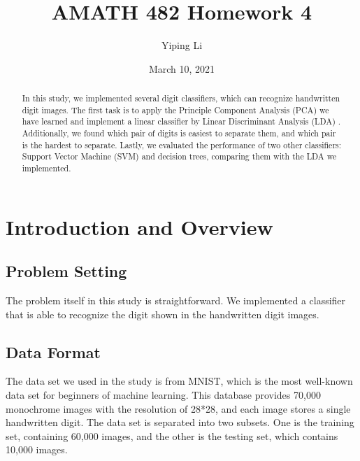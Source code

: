 \documentclass{article}
\title{AMATH 482 Homework 4}
\author{Yiping Li}
\date{March 10, 2021}
\begin{document}
\maketitle

\begin{abstract}
    In this study, we implemented several digit classifiers, which can recognize handwritten digit images. The first task is to apply the Principle Component Analysis (PCA) we have learned and implement a linear classifier by Linear Discriminant Analysis (LDA) . Additionally, we found which pair of digits is easiest to separate them, and which pair is the hardest to separate. Lastly, we evaluated the performance of two other classifiers: Support Vector Machine (SVM) and decision trees, comparing them with the LDA we implemented.
\end{abstract}

\section{Introduction and Overview}
\subsection{Problem Setting}
The problem itself in this study is straightforward. We implemented a classifier that is able to recognize the digit shown in the handwritten digit images.
\subsection{Data Format}
The data set we used in the study is from MNIST, which is the most well-known data set for beginners of machine learning. This database provides 70,000  monochrome images with the resolution of 28*28, and each image stores a single handwritten digit. The data set is separated into two subsets. One is the training set, containing 60,000 images, and the other is the testing set, which contains 10,000 images.
\end{document}
